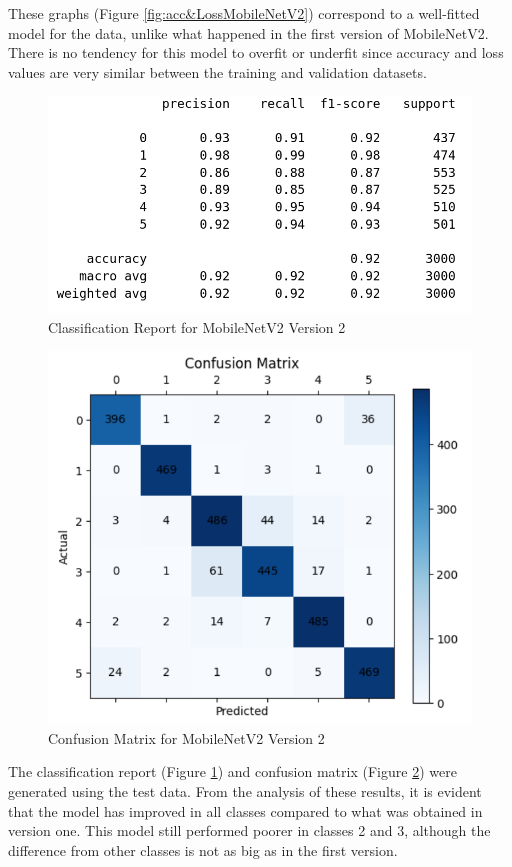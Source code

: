 \documentclass[conference]{IEEEtran}
\begin{document}
These graphs (Figure \ref{fig:acc&LossMobileNetV2}) correspond to a well-fitted model for the data, unlike what happened in the first version of MobileNetV2. There is no tendency for this model to overfit or underfit since accuracy and loss values are very similar between the training and validation datasets.

\begin{figure}[H]
    \centering
    \includegraphics[width=0.8\linewidth]{images/classRepMobileNetV2_2.png}
    \caption{Classification Report for MobileNetV2 Version 2}
    \label{fig:classRepMobileNetV2_2}
\end{figure}

\begin{figure}[H]
    \centering
    \includegraphics[width=0.8\linewidth]{images/confMatrixMobileNetV2_2.png}
    \caption{Confusion Matrix for MobileNetV2 Version 2}
    \label{fig:confMatrixMobileNetV2_2}
\end{figure}

 The classification report (Figure \ref{fig:classRepMobileNetV2_2}) and confusion matrix (Figure \ref{fig:confMatrixMobileNetV2_2}) were generated using the test data. From the analysis of these results, it is evident that the model has improved in all classes compared to what was obtained in version one. This model still performed poorer in classes 2 and 3, although the difference from other classes is not as big as in the first version.
\end{document}

